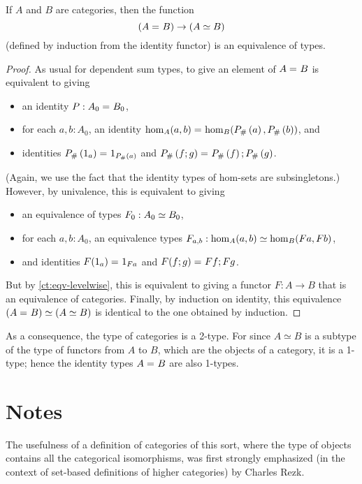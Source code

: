 \begin{thm}\label{ct:cat-2cat}
  If $A$ and $B$ are categories, then the function
  \[(A =_{} B) \to (A\simeq B)\]
  (defined by induction from the identity functor) is an equivalence of types.
\end{thm}
\begin{proof}
  As usual for dependent sum types, to give an element of $A =_{} B$ is equivalent to giving
  \begin{itemize}
  \item an identity $P:A_0 =_{} B_0$,
  \item for each $a,b:A_0$, an identity $\hom_A(a,b) =_{} \hom_B({P}_{\#}\left({a}\right),{P}_{\#}\left({b}\right))$, and
  \item identities ${P}_{\#}\left({1_a}\right) =_{} 1_{{P}_{\#}\left({a}\right)}$ and ${P}_{\#}\left({f;g}\right) =_{} {P}_{\#}\left({f}\right);{P}_{\#}\left({g}\right)$.
  \end{itemize}
  (Again, we use the fact that the identity types of hom-sets are subsingletons.)
  However, by univalence, this is equivalent to giving
  \begin{itemize}
  \item an equivalence of types $F_0:A_0 \simeq B_0$,
  \item for each $a,b:A_0$, an equivalence  types $F_{a,b}:\hom_A(a,b) \simeq \hom_B(F a,F b)$,
  \item and identities $F(1_a) =_{} 1_{Fa}$ and $F(f;g) =_{} F f;F g$.
  \end{itemize}
  But by \autoref{ct:eqv-levelwise}, this is equivalent to giving a functor $F:A\to B$ that is an equivalence of categories.  Finally, by induction on identity, this equivalence $(A =_{} B) \simeq (A\simeq B)$ is identical to the one obtained by induction.
\end{proof}

As a consequence, the type of categories is a 2-type.  For since $A\simeq B$ is a subtype of the type of functors from $A$ to $B$, which are the objects of a category, it is a 1-type; hence the identity types $A =_{} B$ are also 1-types.

\section*{Notes}
\label{sec:ct:notes}

The usefulness of a definition of categories of this sort, where the type of objects contains all the categorical isomorphisms, was first strongly emphasized (in the context of set-based definitions of higher categories) by Charles Rezk.


